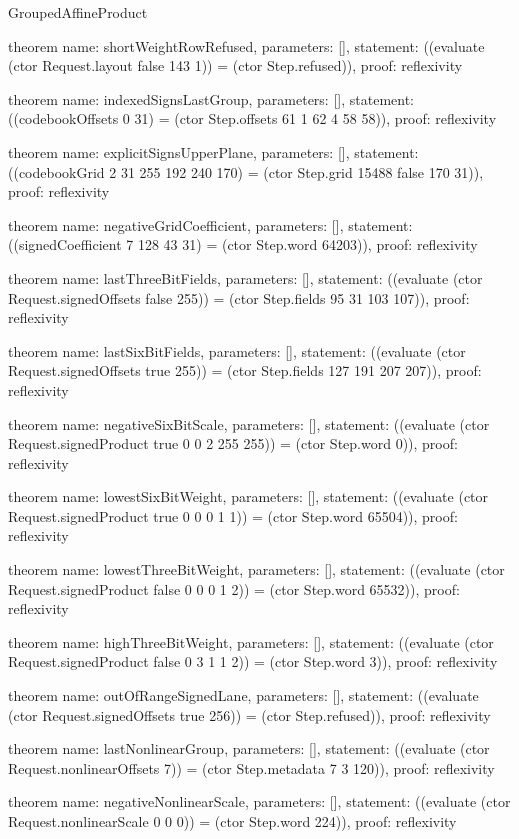 \begin{lexlean}{GroupedAffineProduct}
\begin{semanticmodule}
theorem{
  name: shortWeightRowRefused,
  parameters: [],
  statement: ((evaluate (ctor Request.layout false 143 1)) = (ctor Step.refused)),
  proof: reflexivity{}
}

theorem{
  name: indexedSignsLastGroup,
  parameters: [],
  statement: ((codebookOffsets 0 31) = (ctor Step.offsets 61 1 62 4 58 58)),
  proof: reflexivity{}
}

theorem{
  name: explicitSignsUpperPlane,
  parameters: [],
  statement: ((codebookGrid 2 31 255 192 240 170) = (ctor Step.grid 15488 false 170 31)),
  proof: reflexivity{}
}

theorem{
  name: negativeGridCoefficient,
  parameters: [],
  statement: ((signedCoefficient 7 128 43 31) = (ctor Step.word 64203)),
  proof: reflexivity{}
}

theorem{
  name: lastThreeBitFields,
  parameters: [],
  statement: ((evaluate (ctor Request.signedOffsets false 255)) = (ctor Step.fields 95 31 103 107)),
  proof: reflexivity{}
}

theorem{
  name: lastSixBitFields,
  parameters: [],
  statement: ((evaluate (ctor Request.signedOffsets true 255)) = (ctor Step.fields 127 191 207 207)),
  proof: reflexivity{}
}

theorem{
  name: negativeSixBitScale,
  parameters: [],
  statement: ((evaluate (ctor Request.signedProduct true 0 0 2 255 255)) = (ctor Step.word 0)),
  proof: reflexivity{}
}

theorem{
  name: lowestSixBitWeight,
  parameters: [],
  statement: ((evaluate (ctor Request.signedProduct true 0 0 0 1 1)) = (ctor Step.word 65504)),
  proof: reflexivity{}
}

theorem{
  name: lowestThreeBitWeight,
  parameters: [],
  statement: ((evaluate (ctor Request.signedProduct false 0 0 0 1 2)) = (ctor Step.word 65532)),
  proof: reflexivity{}
}

theorem{
  name: highThreeBitWeight,
  parameters: [],
  statement: ((evaluate (ctor Request.signedProduct false 0 3 1 1 2)) = (ctor Step.word 3)),
  proof: reflexivity{}
}

theorem{
  name: outOfRangeSignedLane,
  parameters: [],
  statement: ((evaluate (ctor Request.signedOffsets true 256)) = (ctor Step.refused)),
  proof: reflexivity{}
}

theorem{
  name: lastNonlinearGroup,
  parameters: [],
  statement: ((evaluate (ctor Request.nonlinearOffsets 7)) = (ctor Step.metadata 7 3 120)),
  proof: reflexivity{}
}

theorem{
  name: negativeNonlinearScale,
  parameters: [],
  statement: ((evaluate (ctor Request.nonlinearScale 0 0 0)) = (ctor Step.word 224)),
  proof: reflexivity{}
}


\end{semanticmodule}
\end{lexlean}
